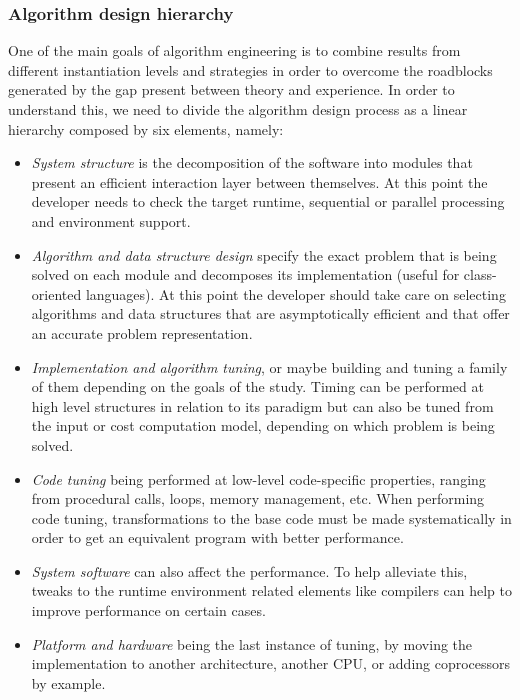 \subsubsection{Algorithm design hierarchy}

One of the main goals of algorithm engineering is to combine results from different instantiation levels and strategies in order to overcome the roadblocks generated by the gap present between theory and experience. In order to understand this, we need to divide the algorithm design process as a linear hierarchy composed by six elements, namely:\\

\begin{itemize}
    \item \textit{System structure} is the decomposition of the software into modules that present an efficient interaction layer between themselves. At this point the developer needs to check the target runtime, sequential or parallel processing and environment support.
    \item \textit{Algorithm and data structure design} specify the exact problem that is being solved on each module and decomposes its implementation (useful for class-oriented languages). At this point the developer should take care on selecting algorithms and data structures that are asymptotically efficient and that offer an accurate problem representation.
    \item \textit{Implementation and algorithm tuning}, or maybe building and tuning a family of them depending on the goals of the study. Timing can be performed  at high level structures in relation to its paradigm but can also be tuned from the input or cost computation model, depending on which problem is being solved.
    \item \textit{Code tuning} being performed at low-level code-specific properties, ranging from procedural calls, loops, memory management, etc. When performing code tuning, transformations to the base code must be made systematically in order to get an equivalent program with better performance.
    \item \textit{System software} can also affect the performance. To help alleviate this, tweaks to the runtime environment related elements like compilers can help to improve performance on certain cases.
    \item \textit{Platform and hardware} being the last instance of tuning, by moving the implementation to another architecture, another CPU, or adding coprocessors by example.
\end{itemize}

